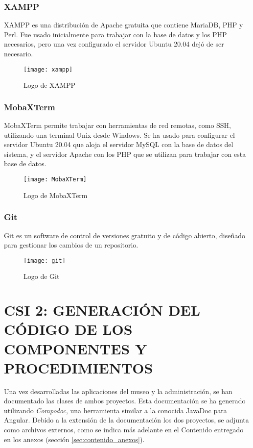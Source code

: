 \subsubsection{XAMPP}
XAMPP es una distribución de Apache gratuita que contiene MariaDB, PHP y Perl\cite{Xampp}. Fue usado inicialmente para trabajar con la base de datos y los PHP necesarios, pero una vez configurado el servidor Ubuntu 20.04 dejó de ser necesario.
\begin{figure}[H]
	\centering
	\texttt{[image: xampp]}
	\caption{Logo de XAMPP}
\end{figure}
\subsubsection{MobaXTerm}
MobaXTerm permite trabajar con herramientas de red remotas, como SSH, utilizando una terminal Unix desde Windows. Se ha usado para configurar el servidor Ubuntu 20.04 que aloja el servidor MySQL con la base de datos del sistema, y el servidor Apache con los PHP que se utilizan para trabajar con esta base de datos.
\begin{figure}[H]
	\centering
	\texttt{[image: MobaXTerm]}
	\caption{Logo de MobaXTerm}
\end{figure}

\subsubsection{Git}
Git es un software de control de versiones gratuito y de código abierto, diseñado para gestionar los cambios de un repositorio\cite{Git}.
\begin{figure}[H]
	\centering
	\texttt{[image: git]}
	\caption{Logo de Git}
\end{figure}

\newpage
\section[CSI 2: GENERACIÓN DEL CÓDIGO DE LOS COMPONENTES Y \\ PROCEDIMIENTOS]{CSI 2: GENERACIÓN DEL CÓDIGO DE LOS COMPONENTES Y PROCEDIMIENTOS}
Una vez desarrolladas las aplicaciones del museo y la administración, se han documentado las clases de ambos proyectos. Esta documentación se ha generado utilizando \textit{Compodoc}, una herramienta similar a la conocida JavaDoc para Angular. Debido a la extensión de la documentación los dos proyectos, se adjunta como archivos externos, como se indica más adelante en el Contenido entregado en los anexos (sección \ref{sec:contenido_anexos}).


